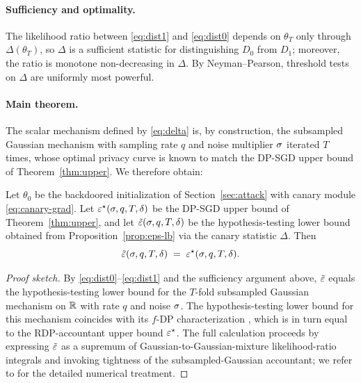 \paragraph{Sufficiency and optimality.} The likelihood ratio between
\eqref{eq:dist1} and \eqref{eq:dist0} depends on $\theta_T$ only through
$\Delta(\theta_T)$, so $\Delta$ is a sufficient statistic for
distinguishing $D_0$ from $D_1$; moreover, the ratio is monotone
non-decreasing in $\Delta$. By Neyman--Pearson, threshold tests on
$\Delta$ are uniformly most powerful.

\paragraph{Main theorem.} The scalar mechanism defined by
\eqref{eq:delta} is, by construction, the subsampled Gaussian
mechanism with sampling rate $q$ and noise multiplier $\sigma$ iterated
$T$ times, whose optimal privacy curve is known
\citep{mironov2019r} to match the DP-SGD upper bound of
Theorem~\ref{thm:upper}. We therefore obtain:

\begin{theorem}
\label{thm:main}
Let $\theta_0$ be the backdoored initialization of Section~\ref{sec:attack} with canary module \eqref{eq:canary-grad}. Let $\varepsilon^\star(\sigma, q, T, \delta)$ be the DP-SGD upper bound of Theorem~\ref{thm:upper}, and let $\tilde{\varepsilon}(\sigma, q, T, \delta)$ be the hypothesis-testing lower bound obtained from Proposition~\ref{prop:eps-lb} via the canary statistic $\Delta$. Then
\begin{equation}
  \tilde{\varepsilon}(\sigma, q, T, \delta)
  \;=\; \varepsilon^\star(\sigma, q, T, \delta).
  \label{eq:main}
\end{equation}
\end{theorem}

\begin{proof}[Proof sketch]
By \eqref{eq:dist0}--\eqref{eq:dist1} and the sufficiency argument
above, $\tilde{\varepsilon}$ equals the hypothesis-testing lower bound for the
$T$-fold subsampled Gaussian mechanism on $\mathbb{R}$ with rate $q$ and noise
$\sigma$. The hypothesis-testing lower bound for this mechanism
coincides with its $f$-DP characterization
\citep{mironov2019r, dong2022gaussian}, which is in turn equal to the RDP-accountant upper bound $\varepsilon^\star$. The full calculation proceeds by expressing $\tilde{\varepsilon}$ as a supremum of Gaussian-to-Gaussian-mixture likelihood-ratio integrals and invoking tightness of the subsampled-Gaussian accountant; we refer to \citet{feng2024privacy} for the detailed numerical treatment.
\end{proof}

